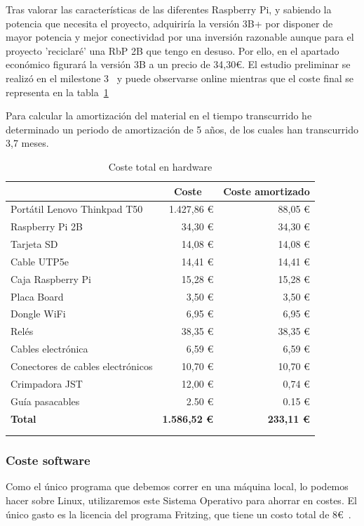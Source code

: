 Tras valorar las características de las diferentes Raspberry Pi, y sabiendo la potencia que necesita el proyecto, adquiriría la versión 3B+ por disponer de mayor potencia y mejor conectividad por una inversión razonable aunque para el proyecto 'reciclaré' una RbP 2B que tengo en desuso. Por ello, en el apartado económico figurará la versión 3B a un precio de 34,30€. El estudio preliminar se realizó en el milestone 3~\cite{misc:Milestone3} y puede observarse online mientras que el coste final se representa en la tabla~\ref{tab:CosteHW}

Para calcular la amortización del material en el tiempo transcurrido he determinado un periodo de amortización de 5 años, de los cuales han transcurrido 3,7 meses.

\begin{longtable}[c]{@{}lrr@{}}
\toprule
\centering
\multicolumn{1}{c}{\textbf{Concepto}} & \multicolumn{1}{c}{\textbf{Coste}} & \multicolumn{1}{c}{\textbf{Coste amortizado}} \\* \midrule
\endfirsthead
%
\endhead
%
\bottomrule
\endfoot
%
\endlastfoot
%
Portátil Lenovo Thinkpad T50 & 1.427,86 € & 88,05 € \\
Raspberry Pi 2B & 34,30 € & 34,30 € \\
Tarjeta SD & 14,08 € & 14,08 € \\
Cable UTP5e & 14,41 € & 14,41 € \\
Caja Raspberry Pi & 15,28 € & 15,28 € \\
Placa Board & 3,50 € & 3,50 € \\
Dongle WiFi & 6,95 € & 6,95 € \\
Relés & 38,35 € & 38,35 € \\
Cables electrónica & 6,59 € & 6,59 € \\
Conectores de cables electrónicos & 10,70 € & 10,70 € \\
Crimpadora JST & 12,00 € & 0,74 € \\
Guía pasacables & 2.50 € & 0.15 € \\ 
\textbf{Total} & \textbf{1.586,52 €} & \textbf{233,11 €} \\ \bottomrule \\
\caption{Coste total en hardware}
\label{tab:CosteHW}
\end{longtable}

\subsubsection{Coste software}
Como el único programa que debemos correr en una máquina local, lo podemos hacer sobre Linux, utilizaremos este Sistema Operativo para ahorrar en costes. El único gasto es la licencia del programa Fritzing, que tiene un costo total de 8€~\cite{misc:Fritzing}.


